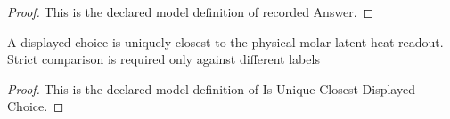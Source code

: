 \begin{proof}
  This is the declared model definition of recorded Answer.
\end{proof}
\begin{definition}
  \label{def:physics:phyx-mini-0625:phyxminiproblems-problemphyxmini0625-isuniqueclosestdisplayedchoice}
  A displayed choice is uniquely closest to the physical molar-latent-heat readout. Strict comparison is required only against different labels
\end{definition}
\begin{proof}
  This is the declared model definition of Is Unique Closest Displayed Choice.
\end{proof}
